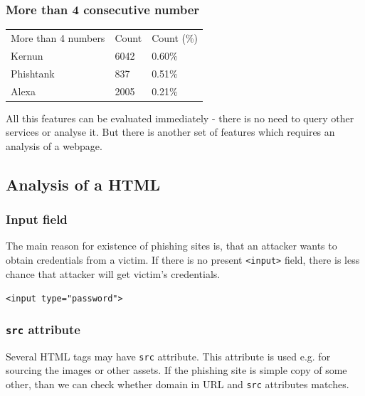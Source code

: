 \documentclass[
  digital, %
  oneside, %
  table,   %
  nolof,     %
  nolot,     %
]{fithesis3}
\newcounter{feature}
\newenvironment{feature}[1]{\stepcounter{feature}%
    \tcolorbox[beamer,%
    noparskip,breakable,
    colback=LightBlue,colframe=DarkBlue,%
    colbacklower=DarkBlue!75!LightBlue,%
    title=Feature~\thefeature: #1]}%
    {\endtcolorbox}
\begin{document}
\subsubsection{More than 4 consecutive number \cite{malicious-url-detection}}

\begin{table}[]
\begin{tabular}{lll}
\multicolumn{1}{c}{More than 4 numbers} & Count & Count (\%) \\
Kernun                                  & 6042  & 0.60\%     \\
Phishtank                               & 837   & 0.51\%     \\
Alexa                                   & 2005  & 0.21\%    
\end{tabular}
\end{table}



All this features can be evaluated immediately - there is no need to query other services or analyse it. But there is another set of features which requires an analysis of a webpage.



\subsection{Analysis of a HTML}
\label{section:html-analysis}

\subsubsection{Input field \cite{url-features-work} \cite{anomaly-based-detection} \cite{cantina} }
The main reason for existence of phishing sites is, that an attacker wants to obtain credentials from a victim. If there is no present \texttt{<input>} field, there is less chance that attacker will get victim's credentials.

\begin{feature}{Input field}
\texttt{<input type="password">}
\end{feature}

\subsubsection{\texttt{src} attribute \cite{url-features-work} 
\cite{cantina} }

Several HTML tags may have \texttt{src} attribute. This attribute is used e.g. for sourcing the images or other assets. If the phishing site is simple copy of some other, than we can check whether domain in URL and \texttt{src} attributes matches.
\end{document}
